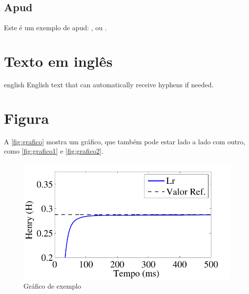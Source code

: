 \subsection{Apud}\label{texto:exemplo:citacao:apud}

Este é um exemplo de apud: , ou .

\section{Texto em inglês}\label{texto:exemplo:textoingles}

\begin{otherlanguage*}{english}
    English text that can automatically receive hyphens if needed.
\end{otherlanguage*}

\section{Figura}\label{texto:exemplo:figura}

A \autoref{fig:grafico} mostra um gráfico, que também pode estar lado a lado com outro, como \autoref{fig:grafico1} e \autoref{fig:grafico2}.

\begin{figure}[htb]
    \caption{Gráfico de exemplo}
    \label{fig:grafico}
    \centering
    \includegraphics[width=.5\linewidth]{fig/grafico.pdf}
\end{figure}


